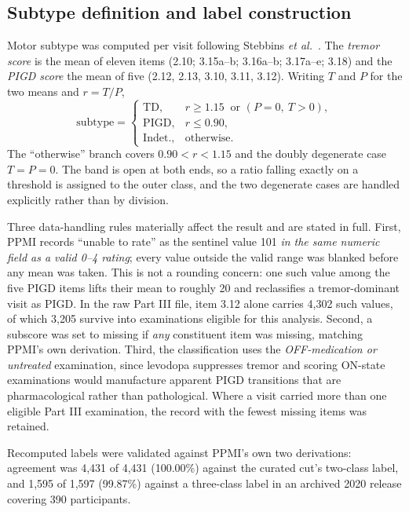 \documentclass[journal]{IEEEtran}
\begin{document}
\subsection{Subtype definition and label construction}
Motor subtype was computed per visit following Stebbins
\textit{et al.}~\cite{stebbins2013}. The \emph{tremor score} is the mean of
eleven items (2.10; 3.15a--b; 3.16a--b; 3.17a--e; 3.18) and the \emph{PIGD
score} the mean of five (2.12, 2.13, 3.10, 3.11, 3.12). Writing $T$ and $P$ for
the two means and $r = T/P$,
\begin{equation}
\mathrm{subtype} =
\begin{cases}
\mathrm{TD}, & r \geq 1.15 \ \text{ or } (P=0,\ T>0),\\
\mathrm{PIGD}, & r \leq 0.90,\\
\mathrm{Indet.}, & \text{otherwise.}
\end{cases}
\label{eq:rule}
\end{equation}
The ``otherwise'' branch covers $0.90 < r < 1.15$ and the doubly degenerate case
$T = P = 0$. The band is open at both ends, so a ratio falling exactly on a
threshold is assigned to the outer class, and the two degenerate cases are
handled explicitly rather than by division.

Three data-handling rules materially affect the result and are stated in full.
First, PPMI records ``unable to rate'' as the sentinel value 101 \emph{in the
same numeric field as a valid 0--4 rating}; every value outside the valid range
was blanked before any mean was taken. This is not a rounding concern: one such
value among the five PIGD items lifts their mean to roughly 20 and reclassifies
a tremor-dominant visit as PIGD. In the raw Part III file, item 3.12 alone
carries 4,302 such values, of which 3,205 survive into examinations eligible for
this analysis. Second, a subscore was set to missing if \emph{any}
constituent item was missing, matching PPMI's own derivation. Third, the
classification uses the \emph{OFF-medication or untreated} examination, since
levodopa suppresses tremor and scoring ON-state examinations would manufacture
apparent PIGD transitions that are pharmacological rather than pathological.
Where a visit carried more than one eligible Part III examination, the record
with the fewest missing items was retained.

Recomputed labels were validated against PPMI's own two derivations: agreement
was 4,431 of 4,431 (100.00\%) against the curated cut's two-class label, and
1,595 of 1,597 (99.87\%) against a three-class label in an archived 2020 release
covering 390 participants.
\end{document}
